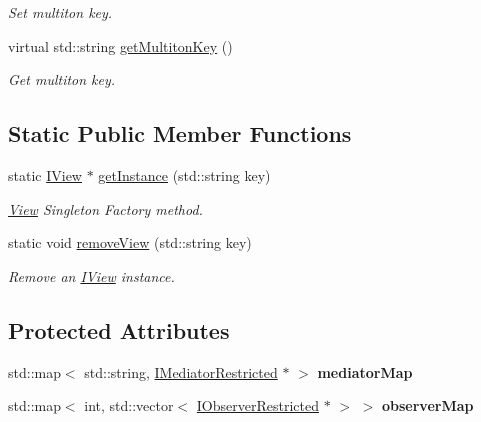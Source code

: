 \begin{DoxyCompactItemize}
\begin{DoxyCompactList}\small\item\em Set multiton key. \item\end{DoxyCompactList}\item 
virtual std::string \hyperlink{class_pure_m_v_c_1_1_multiton_key_heir_aa5622459d33380deb08dc3cab8b991c7}{getMultitonKey} ()
\begin{DoxyCompactList}\small\item\em Get multiton key. \item\end{DoxyCompactList}\end{DoxyCompactItemize}
\subsection*{Static Public Member Functions}
\begin{DoxyCompactItemize}
\item 
static \hyperlink{class_pure_m_v_c_1_1_i_view}{IView} $\ast$ \hyperlink{class_pure_m_v_c_1_1_view_ad1e9acdfeba49c16cc725352b08d4ea3}{getInstance} (std::string key)
\begin{DoxyCompactList}\small\item\em \hyperlink{class_pure_m_v_c_1_1_view}{View} Singleton Factory method. \item\end{DoxyCompactList}\item 
static void \hyperlink{class_pure_m_v_c_1_1_view_aac1d2aea65c021664a89319d9e3159b3}{removeView} (std::string key)
\begin{DoxyCompactList}\small\item\em Remove an \hyperlink{class_pure_m_v_c_1_1_i_view}{IView} instance. \item\end{DoxyCompactList}\end{DoxyCompactItemize}
\subsection*{Protected Attributes}
\begin{DoxyCompactItemize}
\item 
\hypertarget{class_pure_m_v_c_1_1_view_a01affffc11d9363ad16819f3081a595c}{
std::map$<$ std::string, \hyperlink{class_pure_m_v_c_1_1_i_mediator_restricted}{IMediatorRestricted} $\ast$ $>$ {\bfseries mediatorMap}}
\label{class_pure_m_v_c_1_1_view_a01affffc11d9363ad16819f3081a595c}

\item 
\hypertarget{class_pure_m_v_c_1_1_view_a4fa654b56d2478a891784f0f2292db89}{
std::map$<$ int, std::vector$<$ \hyperlink{class_pure_m_v_c_1_1_i_observer_restricted}{IObserverRestricted} $\ast$ $>$ $>$ {\bfseries observerMap}}
\label{class_pure_m_v_c_1_1_view_a4fa654b56d2478a891784f0f2292db89}

\end{DoxyCompactItemize}


